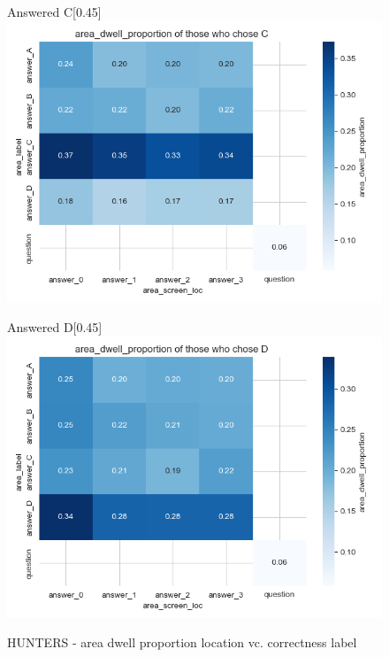 \documentclass{article}
\begin{document}
\begin{figure}[H]
  \vspace{1em} %

  \begin{subcaptionbox}{Answered C\label{fig:C_dp_h}}[0.45\textwidth]
    {\centering\includegraphics[width=\linewidth]{plots/matrix_plots/matrix_area_dwell_proportion_C_hunters.png}}
  \end{subcaptionbox}
  \hfill
  \begin{subcaptionbox}{Answered D\label{fig:D_dp_h}}[0.45\textwidth]
    {\centering\includegraphics[width=\linewidth]{plots/matrix_plots/matrix_area_dwell_proportion_D_hunters.png}}
  \end{subcaptionbox}
  
  \caption{HUNTERS - area dwell proportion location vc. correctness label}
  \label{fig:fourimages1}
\end{figure}
\end{document}
